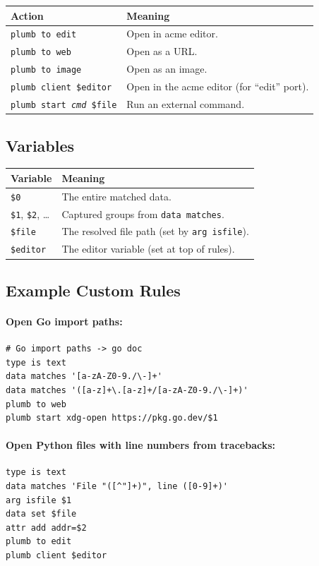 \begin{longtable}{@{}lp{3.2in}@{}}
\toprule
Action & Meaning \\
\midrule
\endhead
\texttt{plumb to edit} & Open in acme editor. \\
\texttt{plumb to web} & Open as a URL. \\
\texttt{plumb to image} & Open as an image. \\
\texttt{plumb client \$editor} & Open in the acme editor (for ``edit''
  port). \\
\texttt{plumb start \textit{cmd} \$file} & Run an external command. \\
\bottomrule
\end{longtable}

\subsection{Variables}

\begin{longtable}{@{}lp{3.5in}@{}}
\toprule
Variable & Meaning \\
\midrule
\endhead
\texttt{\$0} & The entire matched data. \\
\texttt{\$1}, \texttt{\$2}, \ldots & Captured groups from \texttt{data matches}. \\
\texttt{\$file} & The resolved file path (set by \texttt{arg isfile}). \\
\texttt{\$editor} & The editor variable (set at top of rules). \\
\bottomrule
\end{longtable}

\subsection{Example Custom Rules}

\paragraph{Open Go import paths:}
\begin{lstlisting}[frame=none,basicstyle=\small\ttfamily]
# Go import paths -> go doc
type is text
data matches '[a-zA-Z0-9./\-]+'
data matches '([a-z]+\.[a-z]+/[a-zA-Z0-9./\-]+)'
plumb to web
plumb start xdg-open https://pkg.go.dev/$1
\end{lstlisting}

\paragraph{Open Python files with line numbers from tracebacks:}
\begin{lstlisting}[frame=none,basicstyle=\small\ttfamily]
type is text
data matches 'File "([^"]+)", line ([0-9]+)'
arg isfile $1
data set $file
attr add addr=$2
plumb to edit
plumb client $editor
\end{lstlisting}

